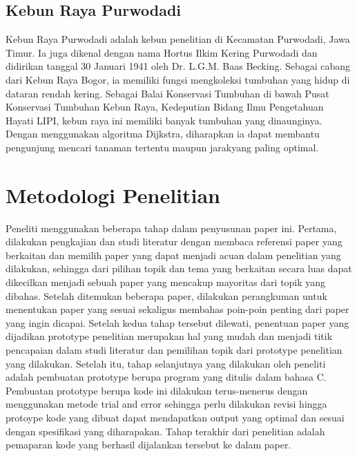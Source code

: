 \documentclass[10pt]{IEEEtran}
\begin{document}
\subsection{Kebun Raya Purwodadi}
Kebun Raya Purwodadi adalah kebun penelitian di Kecamatan Purwodadi, Jawa Timur. Ia juga dikenal dengan nama
Hortus Ilkim Kering Purwodadi dan didirikan tanggal 30 Januari 1941 oleh Dr. L.G.M. Baas Becking. 
Sebagai cabang dari Kebun Raya Bogor, ia memiliki fungsi mengkoleksi tumbuhan
yang hidup di dataran rendah kering. Sebagai Balai Konservasi
Tumbuhan di bawah Pusat Konservasi Tumbuhan Kebun Raya,
Kedeputian Bidang Ilmu Pengetahuan Hayati LIPI, kebun raya
ini memiliki banyak tumbuhan yang dinaunginya. Dengan
menggunakan algoritma Dijkstra, diharapkan ia dapat membantu pengunjung 
mencari tanaman tertentu maupun jarakyang paling optimal.


\section{Metodologi Penelitian}
Peneliti menggunakan beberapa tahap dalam penyusunan
paper ini. Pertama, dilakukan pengkajian dan studi literatur
dengan membaca referensi paper yang berkaitan dan memilih
paper yang dapat menjadi acuan dalam penelitian yang dilakukan, 
sehingga dari pilihan topik dan tema yang berkaitan
secara luas dapat dikecilkan menjadi sebuah paper yang 
mencakup mayoritas dari topik yang dibahas. Setelah ditemukan
beberapa paper, dilakukan perangkuman untuk menentukan
paper yang sesuai sekaligus membahas poin-poin penting
dari paper yang ingin dicapai. Setelah kedua tahap tersebut
dilewati, penentuan paper yang dijadikan prototype penelitian
merupakan hal yang mudah dan menjadi titik pencapaian
dalam studi literatur dan pemilihan topik dari prototype penelitian yang dilakukan.
Setelah itu, tahap selanjutnya yang dilakukan oleh peneliti
adalah pembuatan prototype berupa program yang ditulis
dalam bahasa C. Pembuatan prototype berupa kode ini dilakukan terus-menerus dengan menggunakan metode trial and error sehingga perlu dilakukan revisi hingga protoype kode
yang dibuat dapat mendapatkan output yang optimal dan
sesuai dengan spesifikasi yang diharapakan. Tahap terakhir
dari penelitian adalah pemaparan kode yang berhasil dijalankan tersebut ke dalam paper.
\end{document}
